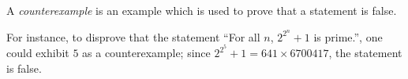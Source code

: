 \documentclass[12pt]{article}
\begin{document}
A \emph{counterexample} is an example which is used to prove that a statement is false.

For instance, to disprove that the statement ``For all $n$, $2^{2^n} + 1$ is prime.'', one could exhibit $5$ as a counterexample; since $2^{2^5} + 1 = 641 \times 6700417$, the statement is false.
\end{document}
